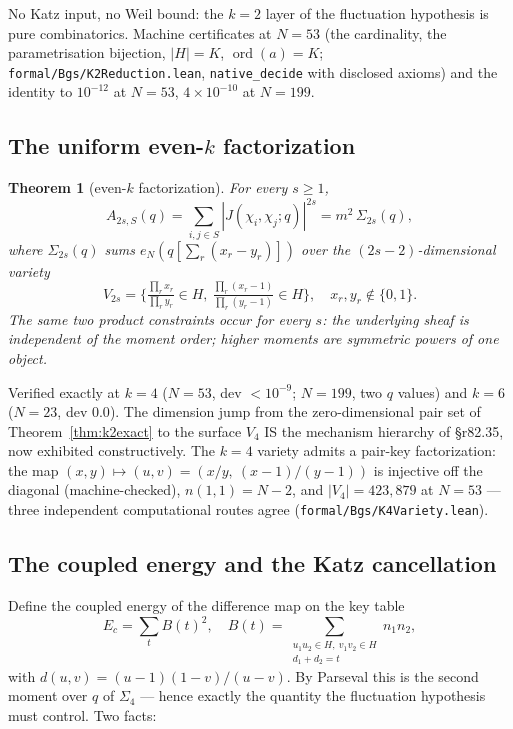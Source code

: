 \documentclass[11pt,reqno]{amsart}
\newtheorem{theorem}{Theorem}[section]
\theoremstyle{definition}
\begin{document}
No Katz input, no Weil bound: the $k{=}2$ layer of the fluctuation
hypothesis is pure combinatorics.  Machine certificates at $N = 53$
(the cardinality, the parametrisation bijection, $|H| = K$,
$\operatorname{ord}(a) = K$; \texttt{formal/Bgs/K2Reduction.lean},
\texttt{native\_decide} with disclosed axioms) and the identity to
$10^{-12}$ at $N = 53$, $4 \times 10^{-10}$ at $N = 199$.

\subsection{The uniform even-\texorpdfstring{$k$}{k} factorization}

\begin{theorem}[even-$k$ factorization]
\label{thm:evenk}
For every $s \ge 1$,
\[
  A_{2s,S}(q) = \sum_{i,j \in S} |J(\chi_i,\chi_j;q)|^{2s}
             = m^2 \, \Sigma_{2s}(q),
\]
where $\Sigma_{2s}(q)$ sums $e_N(q[\textstyle\sum_r (x_r - y_r)])$ over
the $(2s{-}2)$-dimensional variety
\[
  V_{2s} = \Big\{ \tfrac{\prod_r x_r}{\prod_r y_r} \in H,\
  \tfrac{\prod_r (x_r{-}1)}{\prod_r (y_r{-}1)} \in H \Big\},
  \quad x_r, y_r \notin \{0,1\}.
\]
The same two product constraints occur for every $s$: the underlying
sheaf is independent of the moment order; higher moments are symmetric
powers of one object.
\end{theorem}

Verified exactly at $k=4$ ($N = 53$, dev $< 10^{-9}$; $N = 199$, two
$q$ values) and $k=6$ ($N = 23$, dev $0.0$).  The dimension jump from
the zero-dimensional pair set of Theorem~\ref{thm:k2exact} to the
surface $V_4$ IS the mechanism hierarchy of \S r82.35, now exhibited
constructively.  The $k=4$ variety admits a pair-key factorization:
the map $(x,y) \mapsto (u,v) = (x/y,\ (x{-}1)/(y{-}1))$ is injective
off the diagonal (machine-checked), $n(1,1) = N{-}2$, and
$|V_4| = 423{,}879$ at $N = 53$ — three independent computational
routes agree (\texttt{formal/Bgs/K4Variety.lean}).

\subsection{The coupled energy and the Katz cancellation}

Define the coupled energy of the difference map on the key table
\[
  E_c = \sum_t B(t)^2, \quad
  B(t) = \sum_{\substack{u_1 u_2 \in H,\ v_1 v_2 \in H \\ d_1 + d_2 = t}}
        n_1 n_2,
\]
with $d(u,v) = (u{-}1)(1{-}v)/(u{-}v)$.  By Parseval this is the second
moment over $q$ of $\Sigma_4$ — hence exactly the quantity the
fluctuation hypothesis must control.  Two facts:
\end{document}
